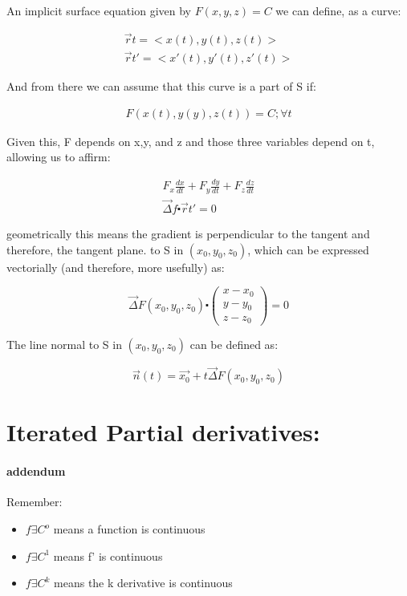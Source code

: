 \documentclass[11pt,fleqn]{book} %
\begin{document}
An implicit surface equation given by $F(x,y,z) = C$ we can define, as a curve:

\begin{gather}
    \vec{r}t = <x(t),y(t),z(t)> \\
    \vec{r}t' = <x'(t),y'(t),z'(t)> 
\end{gather}

And from there we can assume that this curve is a part of S if:

\begin{gather}
    F(x(t), y(y), z(t)) = C ; \forall t
\end{gather}

Given this, F depends on x,y, and z and those three variables depend on t, allowing us
to affirm:

\begin{gather}
    F_x \frac{dx}{dt} + F_y \frac{dy}{dt} + F_z \frac{dz}{dt} \\
    \vec{\Delta} f \centerdot \vec{r}t' = 0
\end{gather}

geometrically this means the gradient is perpendicular to the tangent and therefore, the tangent plane.
to S in $(x_0,y_0,z_0)$, which can be expressed vectorially (and therefore, more usefully) as:

\begin{equation}
    \vec{\Delta}F(x_0,y_0,z_0) \centerdot \begin{pmatrix}
        x - x_0 \\ 
        y - y_0 \\ 
        z - z_0
    \end{pmatrix} = 0
\end{equation}

The line normal to S in $(x_0,y_0,z_0)$ can be defined as:

\begin{equation}
    \vec{n}(t) = \vec{x_0} + t\vec{\Delta} F(x_0,y_0,z_0)
\end{equation}

\section{Iterated Partial derivatives:}

\paragraph*{addendum}

Remember:
\begin{itemize}
    \item $f \exists C^o$ means a function is continuous
    \item $f \exists C^1$ means f' is continuous
    \item $f \exists C^k$ means the k derivative is continuous
\end{itemize}
\end{document}

